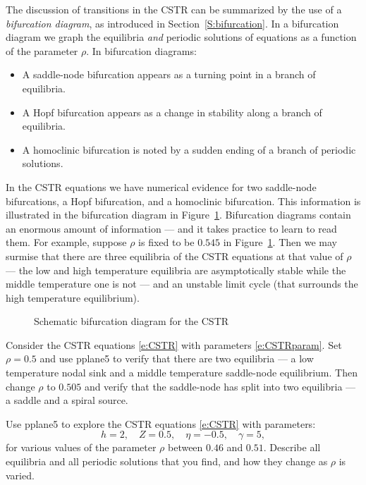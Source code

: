 \documentclass{ximera}
\begin{document}
The discussion of transitions in the 
CSTR can be summarized by the use of a 
{\em bifurcation diagram\/}, as introduced in Section~\ref{S:bifurcation}.  
In a bifurcation diagram we graph the equilibria {\em and\/} periodic 
solutions of equations as a function of the parameter $\rho$.  In 
bifurcation diagrams: 
\begin{itemize}
\item	A saddle-node bifurcation appears as a turning point in 
	a branch of equilibria.
\item	A Hopf bifurcation appears as a change in stability along 
	a branch of equilibria.
\item	A homoclinic bifurcation is noted by a sudden ending of a 
	branch of periodic solutions.
\end{itemize}
In the CSTR equations we have numerical evidence for two saddle-node 
bifurcations, a Hopf bifurcation, and a homoclinic bifurcation.  
This information is illustrated in the bifurcation diagram in 
Figure~\ref{F:CSTRbif}.  Bifurcation diagrams contain an enormous amount 
of information --- and it takes practice to learn to read them.  For 
example, suppose $\rho$ is fixed to be $0.545$ in Figure~\ref{F:CSTRbif}.
Then we may surmise that there are three equilibria of the CSTR equations
at that value of $\rho$ --- the low and high temperature equilibria are 
asymptotically stable while the middle temperature one is not --- and an 
unstable limit cycle (that surrounds the high temperature equilibrium).

\begin{figure}[htb]
           \centerline{%
	   }
           \caption{Schematic bifurcation diagram for the CSTR}
           \label{F:CSTRbif}
\end{figure}


\EXER

\CEXER

\begin{exercise}  \label{E:CSTR5}
Consider the CSTR equations \eqref{e:CSTR} with parameters 
\eqref{e:CSTRparam}. Set $\rho=0.5$ and use 
{\sf pplane5} to verify 
that there are two equilibria --- a low temperature nodal sink 
and a middle temperature saddle-node equilibrium.  Then change 
$\rho$ to $0.505$ and verify that the saddle-node has split 
into two equilibria --- a saddle and a spiral source.
\end{exercise}

\begin{exercise} \label{c9.2.2}
Use {\sf pplane5} to explore the CSTR equations \eqref{e:CSTR} with
parameters:
\[
h=2, \quad Z=0.5, \quad \eta=-0.5, \quad \gamma=5,
\]
for various values of the parameter $\rho$ between $0.46$ and 
$0.51$.  Describe all equilibria and all periodic solutions that 
you find, and how they change as $\rho$ is varied.
\end{exercise}
\end{document}
